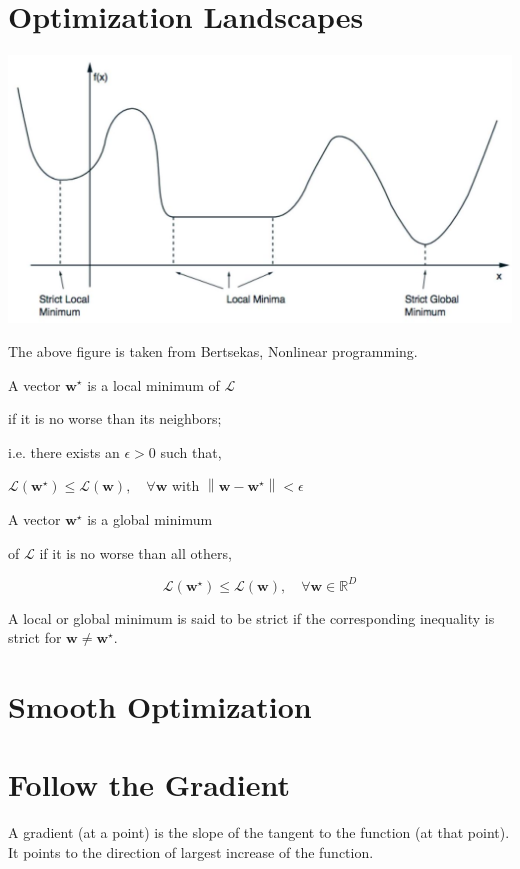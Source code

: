 \documentclass[10pt]{article}
\begin{document}
\section*{Optimization Landscapes}
\begin{center}
\includegraphics[max width=\textwidth]{2023_12_30_4ff132a3450066e65b4fg-04}
\end{center}

The above figure is taken from Bertsekas, Nonlinear programming.

A vector $\mathbf{w}^{\star}$ is a local minimum of $\mathcal{L}$

if it is no worse than its neighbors;

i.e. there exists an $\epsilon>0$ such that,

$\mathcal{L}\left(\mathbf{w}^{\star}\right) \leq \mathcal{L}(\mathbf{w}), \quad \forall \mathbf{w}$ with $\left\|\mathbf{w}-\mathbf{w}^{\star}\right\|<\epsilon$

A vector $\mathbf{w}^{\star}$ is a global minimum

of $\mathcal{L}$ if it is no worse than all others,

$$
\mathcal{L}\left(\mathbf{w}^{\star}\right) \leq \mathcal{L}(\mathbf{w}), \quad \forall \mathbf{w} \in \mathbb{R}^{D}
$$

A local or global minimum is said to be strict if the corresponding inequality is strict for $\mathbf{w} \neq \mathbf{w}^{\star}$.

\section*{Smooth Optimization}
\section*{Follow the Gradient}
A gradient (at a point) is the slope of the tangent to the function (at that point). It points to the direction of largest increase of the function.
\end{document}
